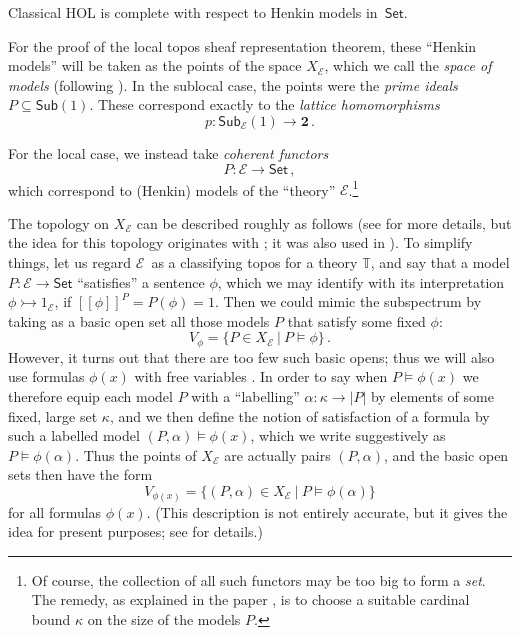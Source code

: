 \documentclass[graybox]{svmult}
\newcommand{\T}{\ensuremath{\mathbb{T}}}
\newcommand{\EE}{\ensuremath{\mathcal{E}}}
\newcommand{\Set}{\ensuremath{\mathsf{Set}}}
\newcommand{\mono}{\ensuremath{\rightarrowtail}}
\begin{document}
\begin{corollary}
Classical HOL is complete with respect to Henkin models in~$\Set$.
\end{corollary}

For the proof of the local topos sheaf representation theorem, these ``Henkin models'' will be taken as the points of the space $X_\EE$, which we call the \emph{space of models} (following \cite{BM}).
In the  sublocal case, the points were the \emph{prime ideals} $P\subseteq\mathsf{Sub}(1)$.
These correspond exactly to the \emph{lattice homomorphisms} $$p: \mathsf{Sub}_{\EE}(1)\to \mathbf{2}\,.$$

For the local case, we instead take \emph{coherent functors} $$P: \EE\to\Set\,,$$
which correspond to (Henkin) models of the ``theory'' $\EE$.\footnote{
Of course, the collection of all such functors may be too big to form a \emph{set}.  The remedy, as explained in the paper \cite{A}, is to choose a suitable cardinal bound $\kappa$ on the size of the models $P$.}

The topology on $X_\EE$ can be described roughly as follows (see \cite{A} for more details, but the idea for this topology originates with \cite{JM,BM}; it was also used in \cite{AF,B}).  To simplify things, let us regard \EE\ as a classifying topos for a theory $\T$, and say that a model $P: \EE\to \Set$ ``satisfies'' a sentence $\phi$, which we may identify with its interpretation $\phi \mono 1_\EE$, if $[\![\phi]\!]^P = P(\phi) = 1$. Then we could mimic the subspectrum by taking as a basic open set all those models $P$ that satisfy some fixed $\phi$:  
\[
V_\phi = \{ P\in X_\EE\ |\ P\models \phi \}\,.
\]
However, it turns out that there are too few such basic opens; thus we will also use formulas $\phi(x)$ with free variables .  In order to say when $P\models \phi(x)$ we therefore equip each model $P$ with a ``labelling'' $\alpha : \kappa \rightarrow |P|$ by elements of some fixed, large set $\kappa$, and we then define the notion of satisfaction of a formula by such a labelled model $(P, \alpha) \models \phi(x)$, which we write suggestively as $P \models \phi(\alpha)$.  Thus the points of $X_\EE$ are actually pairs $(P, \alpha)$, and the basic open sets then have the form 
\[
V_{\phi(x)} = \{ (P,\alpha)\in X_\EE\ |\ P\models \phi(\alpha) \}
\]
for all formulas $\phi(x)$. (This description is not entirely accurate, but it gives the idea for present purposes; see \cite{A,AF,B} for details.)
\end{document}

